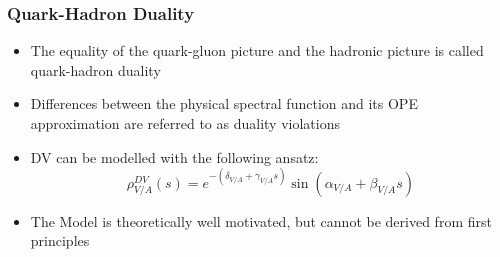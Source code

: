 \documentclass{beamer}
\begin{document}
\begin{frame}
  \frametitle{Quark-Hadron Duality}
  \begin{itemize}
  \item The equality of the quark-gluon picture and the hadronic picture is
    called quark-hadron duality
  \item Differences between the physical spectral function and its OPE
    approximation are referred to as duality violations
  \item DV can be modelled with the following ansatz:
    \begin{equation}
      \rho_{V/A}^{DV}(s) = e^{-(\delta_{V/A} + \gamma_{V/A}s)} \sin(\alpha_{V/A} + \beta_{V/A}s)
    \end{equation}
    \begin{scriptsize}
      \cite{Boito2011a}
    \end{scriptsize}
  \item The Model is theoretically well motivated, but cannot be derived from
    first principles
  \end{itemize}
\end{frame}
\end{document}
